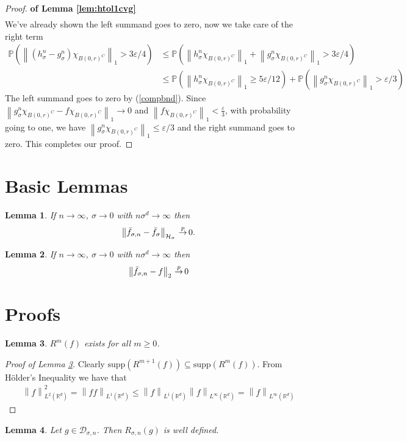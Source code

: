 \documentclass{article} %
\def\hsig{{\mathcal{H}_\sigma}}
\def\dsign{{\mathcal{D}_{\sigma,n}}}
\def\kde{{\bar{f}_{\sigma,n}}} %
\def\gkde{{\bar{f}_\sigma}} %
\def\cip{\,{\buildrel p \over \rightarrow}\,}
\def\irwl{{R_{\sigma,n}}}
\def\rn{\mathbb{R}}
\def\l{\left}
\def\r{\right}
\def\ld{L^2\left( \rn^d \right)}
\newtheorem{lem}{Lemma}
\theoremstyle{definition}
\begin{document}
\begin{proof}{\bf of Lemma \ref{lem:htol1cvg}}
\begin{eqnarray*}
	\end{eqnarray*}
	We've already shown the left summand goes to zero, now we take care of the right term 
	\begin{eqnarray*}
		\mathbb{P}\l(   \l\|\l(h_\sigma^n- g_\sigma^n\r)\chi_{B(0,r)^C} \r\|_1   > 3\varepsilon/4\r)
		&\le \mathbb{P}\l(\l\|h_\sigma^n\chi_{B(0,r)^C}\r\|_1 +\l\|g_\sigma^n\chi_{B(0,r)^C}\r\|_1 >3\varepsilon/4\r)\\
		&\le \mathbb{P}\l(  \l\|h_\sigma^n\chi_{B(0,r)^C}\r\|_1\ge5\varepsilon/12\r) +\mathbb{P}\l( \l\|g_\sigma^n\chi_{B(0,r)^C}\r\|_1>\varepsilon/3 \r)
	\end{eqnarray*}
	The left summand goes to zero by (\ref{compbnd}). Since $\l\|g_\sigma^n\chi_{B\l(0,r \r)^C}-f\chi_{B\l(0,r\r)^C}\r\|_1 \to 0$ and \newline $\l\|f\chi_{B\l(0,r\r)^C}\r\|_1 <\frac{\varepsilon}{3}$, with probability going to one, we have  $\l\|g_\sigma^n\chi_{B\l(0,r\r)^C}\r\|_1 \le \varepsilon/3$ and the right summand goes to zero. This completes our proof.
\end{proof}

\section{Basic Lemmas}
\begin{lem}\label{lem:kdebiashsig}
	If $n\to \infty$, $\sigma \to 0$ with  $n\sigma^d \to \infty$ then 
	\begin{eqnarray*}
		\l\|\kde - \gkde\r\|_\hsig \cip 0.
	\end{eqnarray*}
\end{lem}
\begin{lem}\label{lem:kdel2}
	If $n\to \infty$, $\sigma \to 0$ with  $n\sigma^d \to \infty$ then 
	\begin{eqnarray*}
		\l\|\kde -f \r\|_2 \cip 0
	\end{eqnarray*}
\end{lem}
\appendix
\section{Proofs}
\begin{lem}\label{lem:rwd}
	$R^{m}\left( f \right)$ exists for all $m\ge0$.
\end{lem}
\begin{proof}[Proof of Lemma \ref{lem:rwd}]
	Clearly $\text{supp}\left( R^{m+1}\left( f \right) \right) \subseteq \text{supp}\left( R^m\left( f \right) \right)$. From H\"{o}lder's Inequality we have that
	\begin{eqnarray*}
		\l\|f\r\|_{\ld}^2 = \l\|ff\r\|_{L^1\left( \rn^d \right)} \le \l\|f\r\|_{L^1\left( \rn^d \right)}\l\|f\r\|_{L^\infty\left( \rn^d \right)} = \l\|f\r\|_{L^\infty\left( \rn^d \right)}
	\end{eqnarray*}
\end{proof}
\begin{lem}\label{lem:irwlwd}
	Let $g \in \dsign$. Then $\irwl\left( g \right)$ is well defined.
\end{lem}
\end{document}
